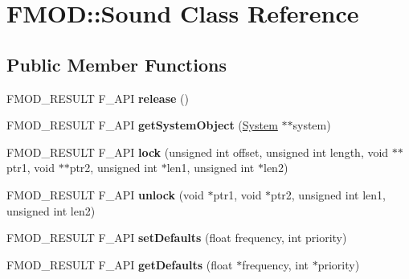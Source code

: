 \hypertarget{classFMOD_1_1Sound}{}\section{F\+M\+OD\+:\+:Sound Class Reference}
\label{classFMOD_1_1Sound}
\subsection*{Public Member Functions}
\begin{DoxyCompactItemize}
\item 
\mbox{\label{classFMOD_1_1Sound_ab0d8425b6f8ad26b4011dc36fee9948c}} 
F\+M\+O\+D\+\_\+\+R\+E\+S\+U\+LT F\+\_\+\+A\+PI {\bfseries release} ()
\item 
\mbox{\label{classFMOD_1_1Sound_aed24d7342fc12299472454730828987e}} 
F\+M\+O\+D\+\_\+\+R\+E\+S\+U\+LT F\+\_\+\+A\+PI {\bfseries get\+System\+Object} (\hyperlink{classFMOD_1_1System}{System} $\ast$$\ast$system)
\item 
\mbox{\label{classFMOD_1_1Sound_a0f83fccead6df86323a21a0ae0207c61}} 
F\+M\+O\+D\+\_\+\+R\+E\+S\+U\+LT F\+\_\+\+A\+PI {\bfseries lock} (unsigned int offset, unsigned int length, void $\ast$$\ast$ptr1, void $\ast$$\ast$ptr2, unsigned int $\ast$len1, unsigned int $\ast$len2)
\item 
\mbox{\label{classFMOD_1_1Sound_ab80dbd8fdc67d3b4c0358de311865da3}} 
F\+M\+O\+D\+\_\+\+R\+E\+S\+U\+LT F\+\_\+\+A\+PI {\bfseries unlock} (void $\ast$ptr1, void $\ast$ptr2, unsigned int len1, unsigned int len2)
\item 
\mbox{\label{classFMOD_1_1Sound_a50de3be9a532bfa635f7e2ba0b0b8a1e}} 
F\+M\+O\+D\+\_\+\+R\+E\+S\+U\+LT F\+\_\+\+A\+PI {\bfseries set\+Defaults} (float frequency, int priority)
\item 
\mbox{\label{classFMOD_1_1Sound_a985bdd51ef10085677bb1b3cfd160e03}} 
F\+M\+O\+D\+\_\+\+R\+E\+S\+U\+LT F\+\_\+\+A\+PI {\bfseries get\+Defaults} (float $\ast$frequency, int $\ast$priority)
\item 
\mbox{\label{classFMOD_1_1Sound_acc2bb0f37e41ccdacfc27ec28cd2cd26}} 
$$
\end{DoxyCompactItemize}
